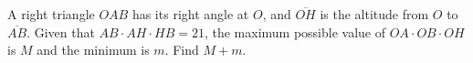A right triangle $OAB$ has its right angle at $O$, and $\overline{OH}$ is the altitude from $O$ to $\overline{AB}$. Given that $AB\cdot AH\cdot HB=21$, the maximum possible value of $OA\cdot OB\cdot OH$ is $M$ and the minimum is $m$. Find $M+m$.
